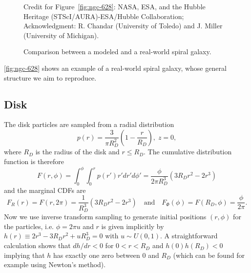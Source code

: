\begin{figure}[htp]
    \vspace{0.5em}
    {\footnotesize
        Credit for Figure~\ref{fig:ngc-628}: NASA, ESA, and the Hubble Heritage (STScI/AURA)-ESA/Hubble Collaboration;
        Acknowledgment: R. Chandar (University of Toledo) and J. Miller (University of Michigan). \par}

    \caption{Comparison between a modeled and a real-world spiral galaxy.}
    \label{fig:galaxy-comparison}
\end{figure}
\autoref{fig:ngc-628} shows an example of a real-world spiral galaxy, whose general structure we aim to reproduce.

\subsection{Disk}\label{subsec:disk}
The disk particles are sampled from a radial distribution
\begin{equation*}
    p(r) = \frac{3}{\pi R_D^2}\left(1 - \frac{r}{R_D}\right), \; z = 0,
\end{equation*}
where $R_D$ is the radius of the disk and $r \leq R_D$.
The cumulative distribution function is therefore
\begin{equation*}
    F(r, \phi) = \int_{0}^{\phi}\int_{0}^{r} p(r') r'dr'd\phi' = \frac{\phi}{2\pi R_D^3}(3R_D r^2-2r^3)
\end{equation*}
and the marginal CDFs are
\begin{equation*}
    F_R(r) = F(r, 2\pi) = \frac{1}{R_D^3}(3R_D r^2-2r^3) \quad \text{and} \quad F_\Phi(\phi) = F(R_D, \phi) = \frac{\phi}{2\pi}.
\end{equation*}
Now we use inverse transform sampling to generate initial positions $(r, \phi)$ for the particles, i.e. $\phi = 2\pi u$ and $r$ is given implicitly by $h(r) \equiv 2r^3 - 3R_D r^2 + uR_D^3 = 0$ with $u \sim U(0, 1)$.
A straightforward calculation shows that $dh/dr < 0$ for $0 < r < R_D$ and $h(0)h(R_D) < 0$ implying that $h$ has exactly one zero between 0 and $R_D$ (which can be found for example using Newton's method).

